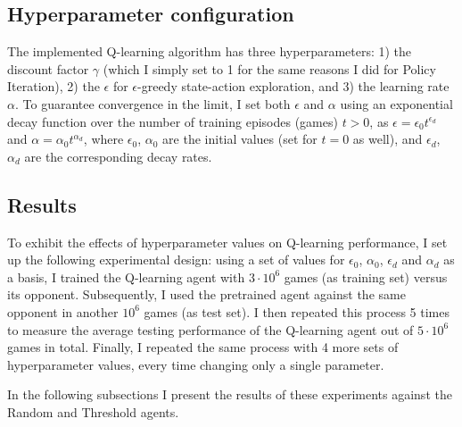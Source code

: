 \subsection{Hyperparameter configuration}

The implemented Q-learning algorithm has three hyperparameters: 1) the discount factor $\gamma$ (which I simply set to 1 for the same reasons I did for Policy Iteration), 2) the $\epsilon$ for $\epsilon$-greedy state-action exploration, and 3) the learning rate $\alpha$. To guarantee convergence in the limit, I set both $\epsilon$ and $\alpha$ using an exponential decay function over the number of training episodes (games) $t>0$, as $\epsilon = \epsilon_0 t^{\epsilon_d}$ and $\alpha = \alpha_0 t^{\alpha_d}$, where $\epsilon_0$, $\alpha_0$ are the initial values (set for $t=0$ as well), and $\epsilon_d$, $\alpha_d$ are the corresponding decay rates. 

\subsection{Results}

To exhibit the effects of hyperparameter values on Q-learning performance, I set up the following experimental design: using a set of values for $\epsilon_0$, $\alpha_0$, $\epsilon_d$ and $\alpha_d$ as a basis, I trained the Q-learning agent with $3\cdot10^6$ games (as training set) versus its opponent. Subsequently, I used the pretrained agent against the same opponent in another $10^6$ games (as test set). I then repeated this process 5 times to measure the average testing performance of the Q-learning agent out of $5\cdot10^6$ games in total. Finally, I repeated the same process with 4 more sets of hyperparameter values, every time changing only a single parameter.

In the following subsections I present the results of these experiments against the Random and Threshold agents.

